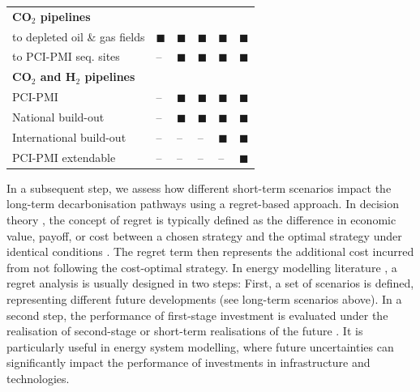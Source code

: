 \documentclass[pdflatex,sn-nature]{sn-jnl}
\theoremstyle{thmstyleone}%
\theoremstyle{thmstyletwo}%
\theoremstyle{thmstylethree}%
\begin{document}
\begin{table}[htpb]
\begin{tabularx}{\linewidth}{R{4.2cm}>{\centering\arraybackslash}X>{\centering\arraybackslash}X>{\centering\arraybackslash}X>{\centering\arraybackslash}X>{\centering\arraybackslash}X}
    \midrule
    \textbf{CO$_2$ pipelines} & & & & & \\
    to depleted oil \& gas fields & $\blacksquare$ & $\blacksquare$ & $\blacksquare$ & $\blacksquare$ & $\blacksquare$ \\
    to PCI-PMI seq. sites & -- & $\blacksquare$ & $\blacksquare$ & $\blacksquare$ & $\blacksquare$ \\
    \midrule
    \textbf{CO$_2$ and H$_2$ pipelines} & & & & & \\
    PCI-PMI & -- & $\blacksquare$ & $\blacksquare$ & $\blacksquare$ & $\blacksquare$ \\
    National build-out & -- & $\blacksquare$ & $\blacksquare$ & $\blacksquare$ & $\blacksquare$ \\
    International build-out & -- & -- & -- & $\blacksquare$ & $\blacksquare$ \\
    PCI-PMI extendable & -- & -- & -- & -- & $\blacksquare$ \\
    \bottomrule
  \end{tabularx}
  \centering
\end{table}

In a subsequent step, we assess how different short-term scenarios impact the long-term decarbonisation pathways using a regret-based approach. In decision theory \cite{loomesRegretTheoryAlternative1982}, the concept of regret is typically defined as the difference in economic value, payoff, or cost between a chosen strategy and the optimal strategy under identical conditions \cite{mobiusRegretAnalysisInvestment2020}. The regret term then represents the additional cost incurred from not following the cost-optimal strategy. In energy modelling literature \cite{vanderweijdeEconomicsPlanningElectricity2012,mobiusRegretAnalysisInvestment2020}, a regret analysis is usually designed in two steps: First, a set of scenarios is defined, representing different future developments (see long-term scenarios above). In a second step, the performance of first-stage investment is evaluated under the realisation of second-stage or short-term realisations of the future \cite{salvatoreManagerialEconomicPrinciples2008}. It is particularly useful in energy system modelling, where future uncertainties can significantly impact the performance of investments in infrastructure and technologies. 
\end{document}
